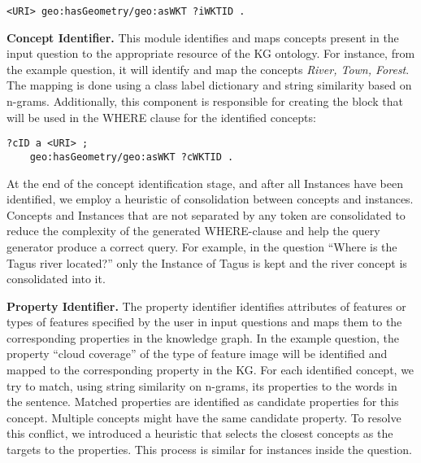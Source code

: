 \begin{lstlisting}[language=SPARQL]
<URI> geo:hasGeometry/geo:asWKT ?iWKTID .
\end{lstlisting}


\textbf{Concept Identifier.} This module identifies and maps concepts present in the input question to the appropriate resource of the KG ontology. For instance, from the example question, it will identify and map the concepts \textit{River, Town, Forest}. The mapping is done using a class label dictionary and string similarity based on n-grams.
Additionally, this component is responsible for creating the block that will be used in the WHERE clause for the identified concepts:

\begin{lstlisting}[language=SPARQL]
?cID a <URI> ; 
    geo:hasGeometry/geo:asWKT ?cWKTID .
\end{lstlisting}

At the end of the concept identification stage, and after all Instances have been identified, we employ a heuristic of consolidation between concepts and instances. Concepts and Instances that are not separated by any token are consolidated to reduce the complexity of the generated WHERE-clause and help the query generator produce a correct query. For example, in the question “Where is the Tagus river located?” only the Instance of Tagus is kept and the river concept is consolidated into it.

\textbf{Property Identifier.} The property identifier identifies attributes of features or types of features specified by the user in input questions and maps them to the corresponding properties in the knowledge graph. In the example question, the property ``cloud coverage'' of the type of feature image will be identified and mapped to the corresponding property in the KG.
For each identified concept, we try to match, using string similarity on n-grams, its properties to the words in the sentence. Matched properties are identified as candidate properties for this concept. Multiple concepts might have the same candidate property. To resolve this conflict, we introduced a heuristic that selects the closest concepts as the targets to the properties. This process is similar for instances inside the question.

